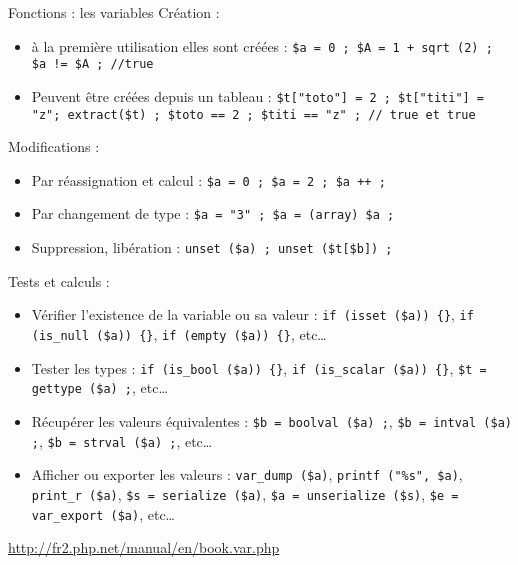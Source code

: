 \begin{frame}[containsverbatim]{Fonctions : les variables}
	Création :
	\begin{itemize}
		\item à la première utilisation elles sont créées : \lstinline~$a = 0 ; $A = 1 + sqrt (2) ; $a != $A ; //true~
		\item Peuvent être créées depuis un tableau : \lstinline~$t["toto"] = 2 ; $t["titi"] = "z"; extract($t) ; $toto == 2 ; $titi == "z" ; // true et true~
	\end{itemize}
	Modifications :
	\begin{itemize}
		\item Par réassignation et calcul : \lstinline~$a = 0 ; $a = 2 ; $a ++ ;~
		\item Par changement de type : \lstinline~$a = "3" ; $a = (array) $a ;~
		\item Suppression, libération : \lstinline~unset ($a) ; unset ($t[$b]) ;~
	\end{itemize}
	Tests et calculs :
	\begin{itemize}
		\item Vérifier l’existence de la variable ou sa valeur : \lstinline~if (isset ($a)) {}~, \lstinline~if (is_null ($a)) {}~, \lstinline~if (empty ($a)) {}~, etc\ldots  
		\item Tester les types : \lstinline~if (is_bool ($a)) {}~, \lstinline~if (is_scalar ($a)) {}~, \lstinline~$t = gettype ($a) ;~, etc\ldots 
		\item Récupérer les valeurs équivalentes : \lstinline~$b = boolval ($a) ;~, \lstinline~$b = intval ($a) ;~, \lstinline~$b = strval ($a) ;~, etc\ldots
		\item Afficher ou exporter les valeurs : \lstinline~var_dump ($a)~, \lstinline~printf ("%s", $a)~, \lstinline~print_r ($a)~, \lstinline~$s = serialize ($a)~, \lstinline~$a = unserialize ($s)~, \lstinline~$e = var_export ($a)~, etc\ldots
	\end{itemize}
	\url{http://fr2.php.net/manual/en/book.var.php}
\end{frame}
 
